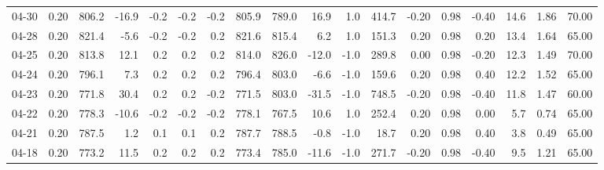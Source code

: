 \begin{threeparttable}
{\begin{tabular}{lrrrrrrrrrrrrrrrrr}
  04-30 &     0.20 & 806.2 &             -16.9 &              -0.2 &               -0.2 &               -0.2 & 805.9 & 789.0 &       16.9 &                      1.0 &               414.7 &      -0.20 &      0.98 &          -0.40 &             14.6 &            1.86 &                  70.00 \\
  04-28 &     0.20 & 821.4 &              -5.6 &              -0.2 &               -0.2 &                0.2 & 821.6 & 815.4 &        6.2 &                      1.0 &               151.3 &       0.20 &      0.98 &           0.20 &             13.4 &            1.64 &                  65.00 \\
  04-25 &     0.20 & 813.8 &              12.1 &               0.2 &                0.2 &                0.2 & 814.0 & 826.0 &      -12.0 &                     -1.0 &               289.8 &       0.00 &      0.98 &          -0.20 &             12.3 &            1.49 &                  70.00 \\
  04-24 &     0.20 & 796.1 &               7.3 &               0.2 &                0.2 &                0.2 & 796.4 & 803.0 &       -6.6 &                     -1.0 &               159.6 &       0.20 &      0.98 &           0.40 &             12.2 &            1.52 &                  65.00 \\
  04-23 &     0.20 & 771.8 &              30.4 &               0.2 &                0.2 &               -0.2 & 771.5 & 803.0 &      -31.5 &                     -1.0 &               748.5 &      -0.20 &      0.98 &          -0.40 &             11.8 &            1.47 &                  60.00 \\
  04-22 &     0.20 & 778.3 &             -10.6 &              -0.2 &               -0.2 &               -0.2 & 778.1 & 767.5 &       10.6 &                      1.0 &               252.4 &       0.20 &      0.98 &           0.00 &              5.7 &            0.74 &                  65.00 \\
  04-21 &     0.20 & 787.5 &               1.2 &               0.1 &                0.1 &                0.2 & 787.7 & 788.5 &       -0.8 &                     -1.0 &                18.7 &       0.20 &      0.98 &           0.40 &              3.8 &            0.49 &                  65.00 \\
  04-18 &     0.20 & 773.2 &              11.5 &               0.2 &                0.2 &                0.2 & 773.4 & 785.0 &      -11.6 &                     -1.0 &               271.7 &      -0.20 &      0.98 &          -0.40 &              9.5 &            1.21 &                  65.00 \\

\end{tabular}}
\end{threeparttable}
